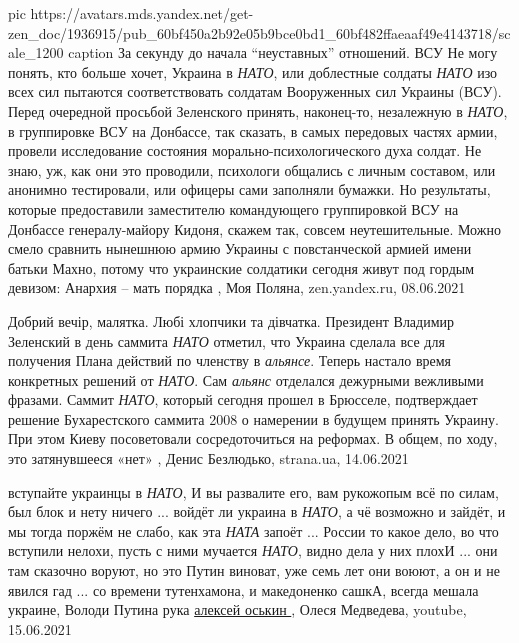 \ifcmt
  pic https://avatars.mds.yandex.net/get-zen_doc/1936915/pub_60bf450a2b92e05b9bce0bd1_60bf482ffaeaaf49e4143718/scale_1200
  caption За секунду до начала \enquote{неуставных} отношений. ВСУ
\fi
Не могу понять, кто больше хочет, Украина в \emph{НАТО}, или доблестные солдаты \emph{НАТО}
изо всех сил пытаются соответствовать солдатам Вооруженных сил Украины (ВСУ).
Перед очередной просьбой Зеленского принять, наконец-то, незалежную в \emph{НАТО}, в
группировке ВСУ на Донбассе, так сказать, в самых передовых частях армии,
провели исследование состояния морально-психологического духа солдат. Не
знаю, уж, как они это проводили, психологи общались с личным составом, или
анонимно тестировали, или офицеры сами заполняли бумажки. Но результаты,
которые предоставили заместителю командующего группировкой ВСУ на Донбассе
генералу-майору Кидоня, скажем так, совсем неутешительные.  Можно смело
сравнить нынешнюю армию Украины с повстанческой армией имени батьки Махно,
потому что украинские солдатики сегодня живут под гордым девизом: Анархия –
мать порядка
, 
Моя Поляна, zen.yandex.ru, 08.06.2021

Добрий вечір, малятка. Любі хлопчики та дівчатка. Президент Владимир Зеленский
в день саммита \emph{НАТО} отметил, что Украина сделала все для получения Плана
действий по членству в \emph{альянсе}. Теперь настало время конкретных решений от
\emph{НАТО}. Сам \emph{альянс} отделался дежурными вежливыми фразами. Саммит \emph{НАТО}, который
сегодня прошел в Брюсселе, подтверждает решение Бухарестского саммита 2008 о
намерении в будущем принять Украину. При этом Киеву посоветовали
сосредоточиться на реформах. В общем, по ходу, это затянувшееся «нет»
, 
Денис Безлюдько, strana.ua, 14.06.2021

вступайте украинцы в \emph{НАТО}, И вы развалите его, вам рукожопым всё по силам, был блок и нету ничего
...
войдёт ли украина в \emph{НАТО}, а чё возможно и зайдёт, и мы тогда поржём не слабо, как эта \emph{НАТА} запоёт
... 
России то какое дело, во что вступили нелохи, пусть с ними мучается \emph{НАТО}, видно дела у них плохИ
...
они там сказочно воруют, но это Путин виноват, уже семь лет они воюют, а он и не явился гад
...
со времени тутенхамона, и македоненко сашкА, всегда мешала украине, Володи Путина рука
\href{https://www.youtube.com/channel/UC8hqtVgH9IJQzGRd9bmS59Q/featured}{
алексей оськин
}
,
Олеся Медведева, youtube, 15.06.2021

